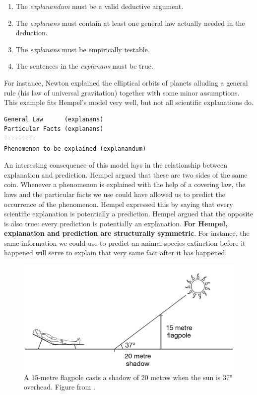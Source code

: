 \documentclass[
]{book}
\providecommand{\tightlist}{%
  \setlength{\itemsep}{0pt}\setlength{\parskip}{0pt}}
\begin{document}
\begin{enumerate}
\def\labelenumi{\arabic{enumi}.}
\tightlist
\item
  The \emph{explanandum} must be a valid deductive argument.
\item
  The \emph{explanans} must contain at least one general law actually needed in the deduction.
\item
  The \emph{explanans} must be empirically testable.
\item
  The sentences in the \emph{explanans} must be true.
\end{enumerate}

For instance, Newton explained the elliptical orbits of planets alluding a general rule (his law of universal gravitation) together with some minor assumptions. This example fits Hempel's model very well, but not all scientific explanations do.

\begin{verbatim}
General Law      (explanans)
Particular Facts (explanans)
---------
Phenomenon to be explained (explanandum)
\end{verbatim}

An interesting consequence of this model lays in the relationship between explanation and prediction. Hempel argued that these are two sides of the same coin. Whenever a phenomenon is explained with the help of a covering law, the laws and the particular facts we use could have allowed us to predict the occurrence of the phenomenon. Hempel expressed this by saying that every scientific explanation is potentially a prediction. Hempel argued that the opposite is also true: every prediction is potentially an explanation. \textbf{For Hempel, explanation and prediction are structurally symmetric}. For instance, the same information we could use to predict an animal species extinction before it happened will serve to explain that very same fact after it has happened.



\begin{figure}

{\centering \includegraphics[width=0.75\linewidth]{Figures/flagpole} 

}

\caption{A 15-metre flagpole casts a shadow of 20 metres when the sun is 37° overhead. Figure from \citep{okasha-pos}.}\label{fig:flagpole}
\end{figure}
\end{document}
